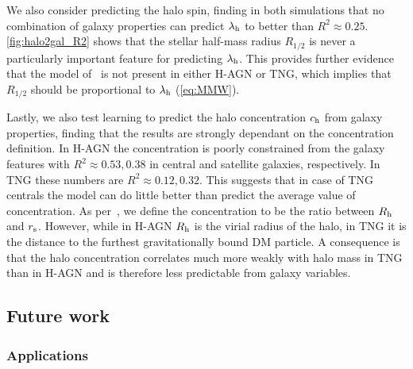 \documentclass[usenatbib,useAMS]{mnras}
\newcommand{\blue}[1]{{\color{bittersweet}#1}}
\begin{document}
We also consider predicting the halo spin, finding in both simulations that no combination of galaxy properties can predict $\lambda_{\rm h}$ to better than $R^2 \approx 0.25$. \cref{fig:halo2gal_R2} shows that the stellar half-mass radius $R_{1/2}$ is never a particularly important feature for predicting $\lambda_{\rm h}$. This provides further evidence that the model of~\citealt{MMW_1998} is not present in either H-AGN or TNG, which implies that $R_{1/2}$ should be proportional to $\lambda_{\rm h}$ (\cref{eq:MMW}).

Lastly, we also test learning to predict the halo concentration $c_{\rm h}$ from galaxy properties, finding that the results are strongly dependant on the concentration definition. In H-AGN the concentration is poorly constrained from the galaxy features with $R^2 \approx 0.53, 0.38$ in central and satellite galaxies, respectively. In TNG these numbers are $R^2\approx0.12, 0.32$. This suggests that in case of TNG centrals the model can do little better than predict the average value of concentration. As per~, we define the concentration to be the ratio between $R_{\rm h}$ and $r_{\rm s}$. However, while in H-AGN $R_{\rm h}$ is the virial radius of the halo, in TNG it is the distance to the furthest gravitationally bound \ac{DM} particle. A consequence is that the halo concentration correlates much more weakly with halo mass in TNG than in H-AGN and is therefore less predictable from galaxy variables.

\subsection{Future work}
\label{sec:future}

\subsubsection{Applications}
\end{document}
